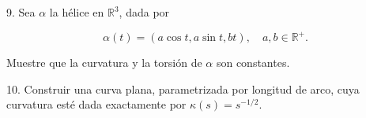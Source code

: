 \begin{problema}


9. Sea $\alpha$ la hélice en $\mathbb{R}^{3}$, dada por

$$
\alpha(t)=(a \cos t, a \sin t, b t), \quad a, b \in \mathbb{R}^{+} .
$$

Muestre que la curvatura y la torsión de $\alpha$ son constantes.
\end{problema}

\begin{problema}

10. Construir una curva plana, parametrizada por longitud de arco, cuya curvatura esté dada exactamente por $\kappa(s)=s^{-1 / 2}$.
\end{problema}

%
%

